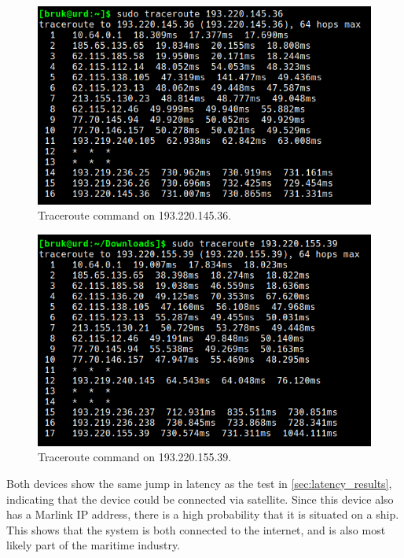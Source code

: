 \begin{figure} [H]
    \centering
    \includegraphics[scale=0.4]{Figurer/marlink_161_2.png}
    \caption{Traceroute command on 193.220.145.36.}
    \label{fig:marlink_traceroute_2}
\end{figure}

\begin{figure} [H]
    \centering
    \includegraphics[scale=0.4]{Figurer/marlink_161_1.png}
    \caption{Traceroute command on 193.220.155.39.}
    \label{fig:marlink_traceroute_1}
\end{figure}

Both devices show the same jump in latency as the test in \cref{sec:latency_results}, indicating that the device could be connected via satellite. Since this device also has a Marlink IP address, there is a high probability that it is situated on a ship. This shows that the system is both connected to the internet, and is also most likely part of the maritime industry. 

